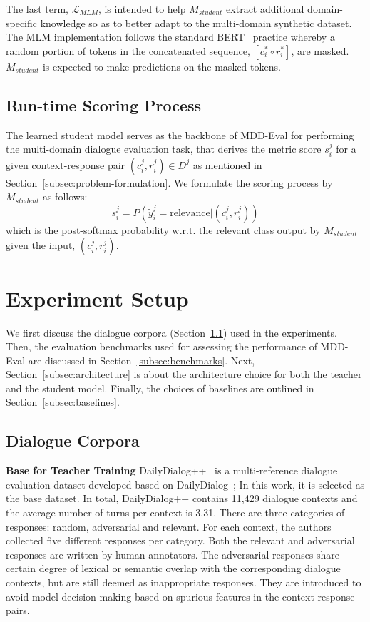 \documentclass[letterpaper]{article} \usepackage{aaai22}  \usepackage{times}  \usepackage{helvet}  \usepackage{courier}  \usepackage[hyphens]{url}  \usepackage{graphicx} \urlstyle{rm} \def\UrlFont{\rm}  \usepackage{natbib}  \usepackage{caption} \DeclareCaptionStyle{ruled}{labelfont=normalfont,labelsep=colon,strut=off} \frenchspacing  \setlength{\pdfpagewidth}{8.5in}  \setlength{\pdfpageheight}{11in}  \usepackage{algorithm}
\begin{document}
The last term, $\mathcal{L}_{MLM}$, is intended to help $M_{student}$ extract additional domain-specific knowledge so as to better adapt to the multi-domain synthetic dataset. The MLM implementation follows the standard BERT~\citep{devlin2019bert} practice whereby a random portion of tokens in the concatenated sequence, $[c_i^{\text{*}} \circ r_i^{\text{*}}]$, are masked. $M_{student}$ is expected to make predictions on the masked tokens.



\subsection{Run-time Scoring Process}
\label{subsec:score-process}
The learned student model serves as the backbone of MDD-Eval for performing the multi-domain dialogue evaluation task, that derives the metric score $s_i^j$ for a given context-response pair $(c_i^j, r_i^j)\in{D^j}$ as mentioned in Section~\ref{subsec:problem-formulation}. We formulate the scoring process by $M_{student}$ as follows:
\begin{equation}
s_i^j = P(\tilde{y}_i^j=\textrm{relevance}|(c_i^j,r_i^j))
\end{equation}
which is the post-softmax probability w.r.t. the relevant class output by $M_{student}$ given the input, $(c_i^j,r_i^j)$.  





\section{Experiment Setup}
\label{sec:experiment}
We first discuss the dialogue corpora (Section~\ref{subsec:datasets}) used in the experiments. Then, the evaluation benchmarks used for assessing the performance of MDD-Eval are discussed in Section~\ref{subsec:benchmarks}. Next, Section~\ref{subsec:architecture} is about the architecture choice for both the teacher and the student model. Finally, the choices of baselines are outlined in Section~\ref{subsec:baselines}.    

\subsection{Dialogue Corpora}
\label{subsec:datasets}
\bigskip
\noindent\textbf{Base for Teacher Training}
DailyDialog++~\citep{sai-etal-2020-improving} is a multi-reference dialogue evaluation dataset developed based on DailyDialog~\citep{li-etal-2017-dailydialog}; In this work, it is selected as the base dataset. In total, DailyDialog++ contains 11,429 dialogue contexts and the average number of turns per context is 3.31. There are three categories of responses: random, adversarial and relevant. For each context, the authors collected five different responses per category. Both the relevant and adversarial responses are written by human annotators. The adversarial responses share certain degree of lexical or semantic overlap with the corresponding dialogue contexts, but are still deemed as inappropriate responses. They are introduced to avoid model decision-making based on spurious features in the context-response pairs.
\end{document}
